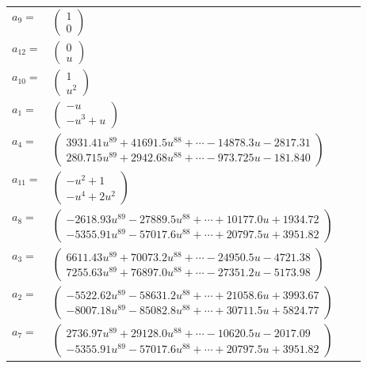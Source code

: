 \documentclass[1p]{elsarticle_modified}
\theoremstyle{definition}
\begin{document}
\begin{tabular}{m{7pt} m{180pt} m{7pt} m{180pt} }
\flushright $a_{9}=$&$\begin{pmatrix}1\\0\end{pmatrix}$ \\
\flushright $a_{12}=$&$\begin{pmatrix}0\\u\end{pmatrix}$ \\
\flushright $a_{10}=$&$\begin{pmatrix}1\\u^2\end{pmatrix}$ \\
\flushright $a_{1}=$&$\begin{pmatrix}- u\\- u^3+u\end{pmatrix}$ \\
\flushright $a_{4}=$&$\begin{pmatrix}3931.41 u^{89}+41691.5 u^{88}+\cdots-14878.3 u-2817.31\\280.715 u^{89}+2942.68 u^{88}+\cdots-973.725 u-181.840\end{pmatrix}$ \\
\flushright $a_{11}=$&$\begin{pmatrix}- u^2+1\\- u^4+2 u^2\end{pmatrix}$ \\
\flushright $a_{8}=$&$\begin{pmatrix}-2618.93 u^{89}-27889.5 u^{88}+\cdots+10177.0 u+1934.72\\-5355.91 u^{89}-57017.6 u^{88}+\cdots+20797.5 u+3951.82\end{pmatrix}$ \\
\flushright $a_{3}=$&$\begin{pmatrix}6611.43 u^{89}+70073.2 u^{88}+\cdots-24950.5 u-4721.38\\7255.63 u^{89}+76897.0 u^{88}+\cdots-27351.2 u-5173.98\end{pmatrix}$ \\
\flushright $a_{2}=$&$\begin{pmatrix}-5522.62 u^{89}-58631.2 u^{88}+\cdots+21058.6 u+3993.67\\-8007.18 u^{89}-85082.8 u^{88}+\cdots+30711.5 u+5824.77\end{pmatrix}$ \\
\flushright $a_{7}=$&$\begin{pmatrix}2736.97 u^{89}+29128.0 u^{88}+\cdots-10620.5 u-2017.09\\-5355.91 u^{89}-57017.6 u^{88}+\cdots+20797.5 u+3951.82\end{pmatrix}$ \\

\end{tabular}
\end{document}
